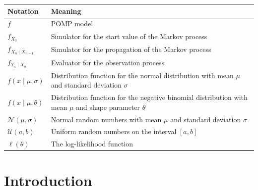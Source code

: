 \documentclass[twoside,openright]{report}
\renewcommand{\arraystretch}{1.5}
\begin{document}
\begin{table}[h]
    \centering
    \begin{tabular}{ p{2cm}  p{8cm} }
     Notation & Meaning \\ 
    \midrule
    
    $f$   &   POMP model  \\
    
    $f_{X_0}$   &  Simulator for the start value of the Markov process  \\
    
    $f_{X_n \mid X_{n-1}}$   & Simulator for the propagation of the Markov process   \\
    
    $f_{Y_n \mid X_{n}}$   &  Evaluator for the observation process  \\
    
    $f(x \mid \mu, \sigma)$ & Distribution function for the normal distribution with mean $\mu$ and standard deviation $\sigma$ \\
    
    $f(x \mid \mu, \theta)$ & Distribution function for the negative binomial distribution with mean $\mu$ and shape parameter $\theta$ \\
    
    $\mathcal{N}(\mu, \sigma)$ & Normal random numbers with mean $\mu$ and standard deviation $\sigma$ \\
    
    $\mathcal{U}(a,b)$ & Uniform random numbers on the interval $[ a , b ]$ \\
    
    $\ell (\theta)$ & The log-likelihood function 
    \end{tabular}
    \label{tab:Notation}
\end{table}


\renewcommand{\arraystretch}{1.3}



\chapter{Introduction}

\end{document}
